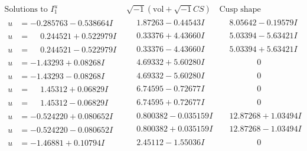 \documentclass[1p]{elsarticle_modified}
\theoremstyle{definition}
\newcommand{\I}{\sqrt{-1}}
\begin{document}
$$\begin{array}{c|c|c}
\text{Solutions to }I^u_{1}& \I (\text{vol} + \sqrt{-1}CS) & \text{Cusp shape}\\
 \hline 
\begin{aligned}
u &= -0.285763 - 0.538664 I\end{aligned}
 & \phantom{-}1.87263 - 0.44543 I & \phantom{-}8.05642 - 0.19579 I \\ \hline\begin{aligned}
u &= \phantom{-}0.244521 + 0.522979 I\end{aligned}
 & \phantom{-}0.33376 + 4.43660 I & \phantom{-}5.03394 - 5.63421 I \\ \hline\begin{aligned}
u &= \phantom{-}0.244521 - 0.522979 I\end{aligned}
 & \phantom{-}0.33376 - 4.43660 I & \phantom{-}5.03394 + 5.63421 I \\ \hline\begin{aligned}
u &= -1.43293 + 0.08268 I\end{aligned}
 & \phantom{-}4.69332 + 5.60280 I & \phantom{-0.000000 } 0 \\ \hline\begin{aligned}
u &= -1.43293 - 0.08268 I\end{aligned}
 & \phantom{-}4.69332 - 5.60280 I & \phantom{-0.000000 } 0 \\ \hline\begin{aligned}
u &= \phantom{-}1.45312 + 0.06829 I\end{aligned}
 & \phantom{-}6.74595 - 0.72677 I & \phantom{-0.000000 } 0 \\ \hline\begin{aligned}
u &= \phantom{-}1.45312 - 0.06829 I\end{aligned}
 & \phantom{-}6.74595 + 0.72677 I & \phantom{-0.000000 } 0 \\ \hline\begin{aligned}
u &= -0.524220 + 0.080652 I\end{aligned}
 & \phantom{-}0.800382 - 0.035159 I & \phantom{-}12.87268 + 1.03494 I \\ \hline\begin{aligned}
u &= -0.524220 - 0.080652 I\end{aligned}
 & \phantom{-}0.800382 + 0.035159 I & \phantom{-}12.87268 - 1.03494 I \\ \hline\begin{aligned}
u &= -1.46881 + 0.10794 I\end{aligned}
 & \phantom{-}2.45112 - 1.55036 I & \phantom{-0.000000 } 0 \\ \hline\begin{aligned}

\end{aligned}
\end{array}$$
\end{document}
